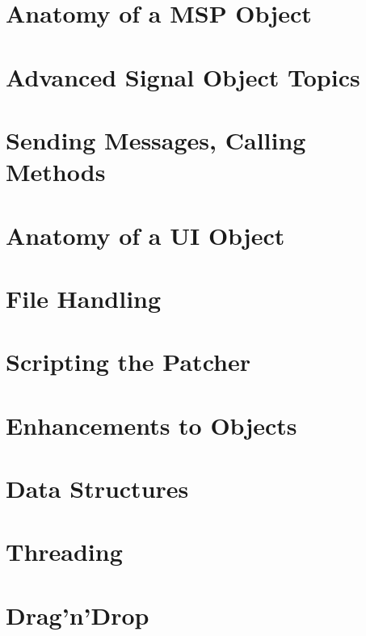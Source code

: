 \documentclass[a4paper]{book}
\begin{document}
\chapter{Anatomy of a MSP Object}
\label{chapter_msp_anatomy}
\hypertarget{chapter_msp_anatomy}{}

\chapter{Advanced Signal Object Topics}
\label{chapter_msp_advanced}
\hypertarget{chapter_msp_advanced}{}

\chapter{Sending Messages, Calling Methods}
\label{chapter_msgattached}
\hypertarget{chapter_msgattached}{}

\chapter{Anatomy of a UI Object}
\label{chapter_ui_anatomy}
\hypertarget{chapter_ui_anatomy}{}

\chapter{File Handling}
\label{chapter_files}
\hypertarget{chapter_files}{}

\chapter{Scripting the Patcher}
\label{chapter_scripting}
\hypertarget{chapter_scripting}{}

\chapter{Enhancements to Objects}
\label{chapter_enhancements}
\hypertarget{chapter_enhancements}{}

\chapter{Data Structures}
\label{chapter_datastructures}
\hypertarget{chapter_datastructures}{}

\chapter{Threading}
\label{chapter_threading}
\hypertarget{chapter_threading}{}

\chapter{Drag'n'Drop}
\label{chapter_dragndrop}
\hypertarget{chapter_dragndrop}{}

\end{document}
